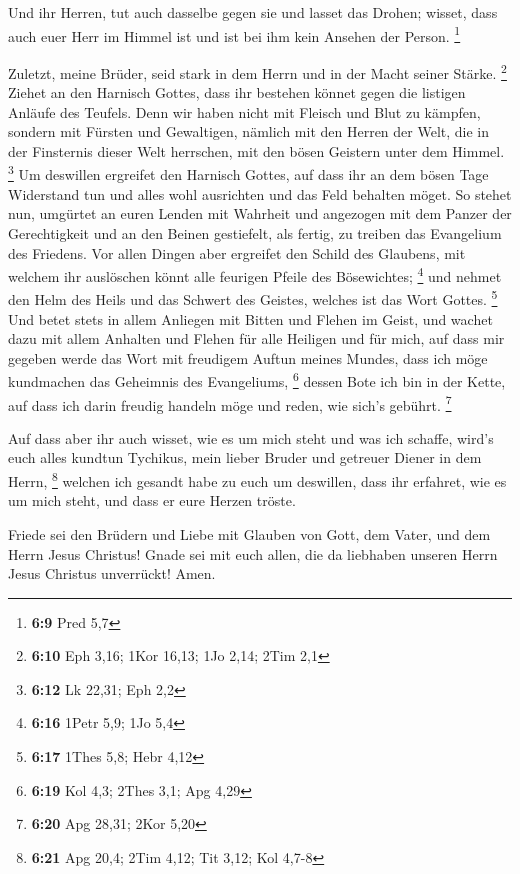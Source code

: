  Und ihr Herren, tut auch dasselbe gegen sie und lasset das
Drohen; wisset, dass auch euer Herr im Himmel ist und ist bei ihm kein
Ansehen der Person. \footnote{\textbf{6:9} Pred 5,7}

 Zuletzt, meine Brüder, seid stark in dem Herrn und in der
Macht seiner Stärke. \footnote{\textbf{6:10} Eph 3,16; 1Kor 16,13; 1Jo
  2,14; 2Tim 2,1}  Ziehet an den Harnisch Gottes, dass ihr
bestehen könnet gegen die listigen Anläufe des Teufels. 
Denn wir haben nicht mit Fleisch und Blut zu kämpfen, sondern mit
Fürsten und Gewaltigen, nämlich mit den Herren der Welt, die in der
Finsternis dieser Welt herrschen, mit den bösen Geistern unter dem
Himmel. \footnote{\textbf{6:12} Lk 22,31; Eph 2,2}  Um
deswillen ergreifet den Harnisch Gottes, auf dass ihr an dem bösen Tage
Widerstand tun und alles wohl ausrichten und das Feld behalten möget.
 So stehet nun, umgürtet an euren Lenden mit Wahrheit und
angezogen mit dem Panzer der Gerechtigkeit  und an den
Beinen gestiefelt, als fertig, zu treiben das Evangelium des Friedens.
 Vor allen Dingen aber ergreifet den Schild des Glaubens,
mit welchem ihr auslöschen könnt alle feurigen Pfeile des Bösewichtes;
\footnote{\textbf{6:16} 1Petr 5,9; 1Jo 5,4}  und nehmet den
Helm des Heils und das Schwert des Geistes, welches ist das Wort Gottes.
\footnote{\textbf{6:17} 1Thes 5,8; Hebr 4,12}  Und betet
stets in allem Anliegen mit Bitten und Flehen im Geist, und wachet dazu
mit allem Anhalten und Flehen für alle Heiligen  und für
mich, auf dass mir gegeben werde das Wort mit freudigem Auftun meines
Mundes, dass ich möge kundmachen das Geheimnis des Evangeliums,
\footnote{\textbf{6:19} Kol 4,3; 2Thes 3,1; Apg 4,29} 
dessen Bote ich bin in der Kette, auf dass ich darin freudig handeln
möge und reden, wie sich's gebührt. \footnote{\textbf{6:20} Apg 28,31;
  2Kor 5,20}

 Auf dass aber ihr auch wisset, wie es um mich steht und
was ich schaffe, wird's euch alles kundtun Tychikus, mein lieber Bruder
und getreuer Diener in dem Herrn, \footnote{\textbf{6:21} Apg 20,4; 2Tim
  4,12; Tit 3,12; Kol 4,7-8}  welchen ich gesandt habe zu
euch um deswillen, dass ihr erfahret, wie es um mich steht, und dass er
eure Herzen tröste.

 Friede sei den Brüdern und Liebe mit Glauben von Gott, dem
Vater, und dem Herrn Jesus Christus!  Gnade sei mit euch
allen, die da liebhaben unseren Herrn Jesus Christus unverrückt! Amen.
